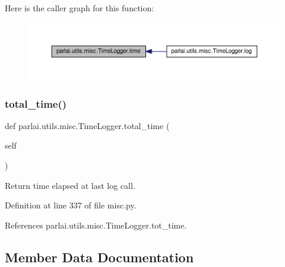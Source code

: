 Here is the caller graph for this function\+:
\nopagebreak
\begin{figure}[H]
\begin{center}
\leavevmode
\includegraphics[width=350pt]{classparlai_1_1utils_1_1misc_1_1TimeLogger_aa8e859dc10c12159501bbf545ca62a51_icgraph}
\end{center}
\end{figure}
\mbox{\label{classparlai_1_1utils_1_1misc_1_1TimeLogger_a18d3faec4442ed5b313c88d566f43b2d}} 
\subsubsection{\texorpdfstring{total\+\_\+time()}{total\_time()}}
{\footnotesize\ttfamily def parlai.\+utils.\+misc.\+Time\+Logger.\+total\+\_\+time (\begin{DoxyParamCaption}\item[{}]{self }\end{DoxyParamCaption})}

\begin{DoxyVerb}Return time elapsed at last log call.\end{DoxyVerb}
 

Definition at line 337 of file misc.\+py.



References parlai.\+utils.\+misc.\+Time\+Logger.\+tot\+\_\+time.



\subsection{Member Data Documentation}
\mbox{\label{classparlai_1_1utils_1_1misc_1_1TimeLogger_a7592e5ebb754f91e73b66b409fda2d77}} 
